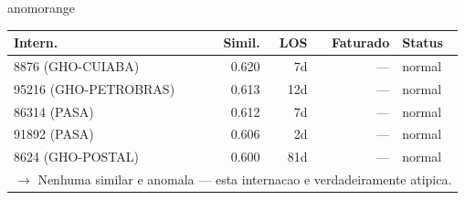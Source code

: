 \documentclass[a4paper,10pt]{article}
\begin{document}
\begin{anomalycard}[Internacao 163887 | GHO-PETROBRAS | ALTO (z=3.76)]{anomorange}
\begin{tabular}{l r r r l}\toprule\textbf{Intern.} & \textbf{Simil.} & \textbf{LOS} & \textbf{Faturado} & \textbf{Status} \\\midrule
8876 (GHO-CUIABA) & 0.620 & 7d & --- & \textcolor{jcubeblue}{normal} \\
95216 (GHO-PETROBRAS) & 0.613 & 12d & --- & \textcolor{jcubeblue}{normal} \\
86314 (PASA) & 0.612 & 7d & --- & \textcolor{jcubeblue}{normal} \\
91892 (PASA) & 0.606 & 2d & --- & \textcolor{jcubeblue}{normal} \\
8624 (GHO-POSTAL) & 0.600 & 81d & --- & \textcolor{jcubeblue}{normal} \\
\multicolumn{5}{l}{\textcolor{jcubeblue}{\small $\rightarrow$ Nenhuma similar e anomala --- esta internacao e verdadeiramente atipica.}} \\
\bottomrule\end{tabular}



\end{anomalycard}

\newpage
\end{document}
